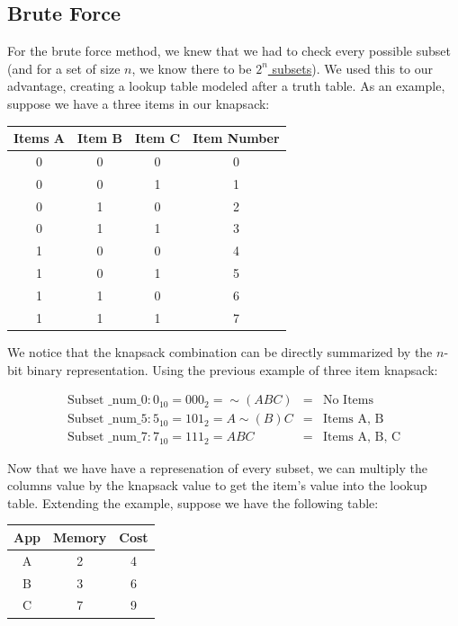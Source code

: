 \documentclass{article}
\begin{document}
\subsection{Brute Force}
For the brute force method, we knew that we had to check every possible subset (and for a set of size $n$, we know there to be \href{http://mathworld.wolfram.com/Subset.html}{$2^n$ subsets}). We used this to our advantage, creating a lookup table modeled after a truth table. As an example, suppose we have a three items in our knapsack:

\begin{center}
    \begin{tabular}{|c|c|c|c|}
        \hline
        Items A & Item B & Item C & Item Number  \\ \hline
        0 & 0 & 0 & 0\\
        0 & 0 & 1 & 1\\
        0 & 1 & 0 & 2\\
        0 & 1 & 1 & 3\\
        1 & 0 & 0 & 4\\
        1 & 0 & 1 & 5\\
        1 & 1 & 0 & 6\\
        1 & 1 & 1 & 7\\
        \hline
    \end{tabular}
\end{center}

We notice that the knapsack combination can be directly summarized by the $n$-bit binary representation. Using the previous example of three item knapsack:

\begin{eqnarray}
    \text{Subset \_num_0}: 0_{10} = 000_{2} = \sim(ABC) & = & \text{No Items} \\
    \text{Subset \_num_5}: 5_{10} = 101_{2} = A\sim(B)C & = & \text{Items A, B} \\
    \text{Subset \_num_7}: 7_{10} = 111_{2} = ABC & = & \text{Items A, B, C}
\end{eqnarray}

Now that we have have a represenation of every subset, we can multiply the columns value by the knapsack value to get the item's value into the lookup table. Extending the example, suppose we have the following table:

\begin{center}
    \begin{tabular}{|c|c|c|}
        \hline
        App & Memory & Cost \\ \hline
        A & 2 & 4 \\
        B & 3 & 6 \\
        C & 7 & 9 \\
        \hline
    \end{tabular}
\end{center}
\end{document}
